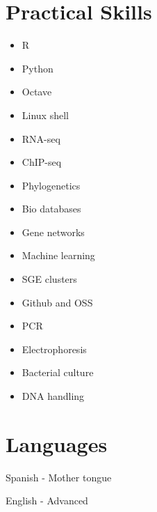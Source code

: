 \documentclass[paper=a4,fontsize=11pt]{article} %
\newcommand{\NewPart}[1]{\section*{
									{#1}}}
\newcommand{\EducationEntry}[4]{
		\noindent \textbf{#1} \hfill      %
		\colorbox{Black}{%
			\parbox{6em}{%
			\hfill\color{White}#2}} \par  %
		\noindent \textit{#3} \par        %
		\normalsize \par}
\begin{document}
\NewPart{Practical Skills}

\begin{multicols}{4}

\begin{itemize}
\item R
\item Python
\item Octave
\item Linux shell
\end{itemize}

\columnbreak

\begin{itemize}
\item RNA-seq
\item ChIP-seq
\item Phylogenetics
\item Bio databases
\end{itemize}

\columnbreak

\begin{itemize}
\item Gene networks
\item Machine learning
\item SGE clusters
\item Github and OSS
\end{itemize}

\columnbreak

\begin{itemize}
\item PCR
\item Electrophoresis
\item Bacterial culture
\item DNA handling
\end{itemize}
\end{multicols}


\NewPart{Languages}

\begin{multicols}{2}

Spanish  - Mother tongue

\columnbreak

English - Advanced

\end{multicols}

%
%
\end{document}

